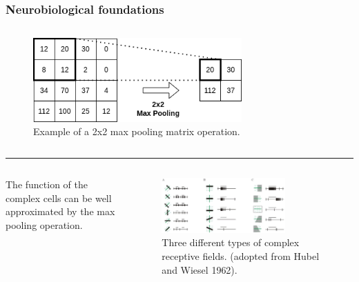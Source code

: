 \documentclass[a4paper,9pt]{beamer}
\theoremstyle{mytheoremstyle}
\begin{document}
\begin{frame}
\frametitle{Neurobiological foundations}
\begin{columns}
\begin{figure}
\begin{center}
  \includegraphics[width=0.75\textwidth]{res/max_pooling.png}
\end{center}
	\caption{Example of a 2x2 max pooling matrix operation.}
\end{figure}
\end{columns}
\hrule
\begin{columns}
\begin{block}{}
The function of the complex cells can be well approximated by the max pooling operation.
\end{block}
\vspace{0.7cm}
\begin{figure}
\begin{center}
  \includegraphics[width=0.75\textwidth]{res/complex_cells.png}
\end{center}
	\caption{Three different types of complex receptive fields. (adopted from Hubel and Wiesel 1962).}
\end{figure}
\end{columns}
\end{frame}
\end{document}
